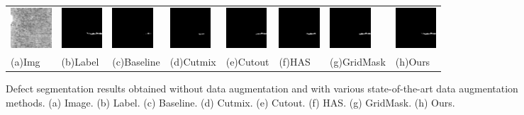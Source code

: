 \documentclass[sn-mathphys]{sn-jnl}%
\theoremstyle{thmstyleone}%
\theoremstyle{thmstyletwo}%
\theoremstyle{thmstylethree}%
\begin{document}
\begin{figure}
{\begin{tabular}{p{1.2cm}p{1.2cm}p{1.2cm}p{1.2cm}p{1.2cm}p{1.2cm}p{1.2cm}p{1.2cm}}
    \includegraphics[width=0.6in]{fig9-2-input.png}&
    \includegraphics[width=0.6in]{fig9-2-y.png}&
    \includegraphics[width=0.6in]{fig9-2-ori.png}&
    \includegraphics[width=0.6in]{fig9-2-cutmix.png}&
    \includegraphics[width=0.6in]{fig9-2-cutout.png}&
    \includegraphics[width=0.6in]{fig9-2-has.png}&
    \includegraphics[width=0.6in]{fig9-2-gridmask.png}&
    \includegraphics[width=0.6in]{fig9-2-ours.png}\\

\centering\footnotesize(a)Img& \centering\footnotesize(b)Label& \centering\footnotesize(c)Baseline& \centering\footnotesize(d)Cutmix& \centering\footnotesize(e)Cutout& \centering\footnotesize(f)HAS& \centering\footnotesize(g)GridMask & \centering\footnotesize(h)Ours\\
\end{tabular}}
	\centering
	\caption{Defect segmentation results obtained without data augmentation and with various state-of-the-art data augmentation methods. (a) Image. (b) Label. (c) Baseline. (d) Cutmix. (e) Cutout. (f) HAS. (g) GridMask. (h) Ours.  }
	\label{fig:4.3.KSD}
\end{figure}
\end{document}
